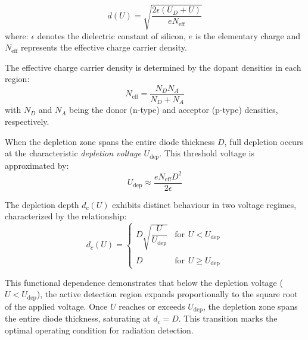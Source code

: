 \begin{equation}
    d(U) = \sqrt{ \frac{ 2 \epsilon (U_D + U) }{eN_{\mathrm{eff}} }}
\end{equation}
where: $\epsilon$ denotes the dielectric constant of silicon, $e$ is the elementary charge and $N_{\mathrm{eff}}$ represents the effective charge carrier density.

The effective charge carrier density is determined by the dopant densities in each region:
\begin{equation}
    N_{\mathrm{eff}} = \frac{ N_D N_A }{ N_D + N_A }
\end{equation}
with $N_D$ and $N_A$ being the donor (n-type) and acceptor (p-type) densities, respectively.

When the depletion zone spans the entire diode thickness $D$, full depletion occurs at the characteristic \textit{depletion voltage} $U_{\mathrm{dep}}$. This threshold voltage is approximated by:
\begin{equation}
    U_{\mathrm{dep}} \approx \frac{e N_{\mathrm{eff}} D^2}{2\epsilon}
\end{equation}

The depletion depth $d_c(U)$ exhibits distinct behaviour in two voltage regimes, characterized by the relationship:
\begin{equation}
d_c(U) = 
\begin{cases} 
D \sqrt{\dfrac{U}{U_{\mathrm{dep}}}} & \text{for}\hspace{5pt} U < U_{\mathrm{dep}} \\
\\
D & \text{for}\hspace{5pt} U \geq U_{\mathrm{dep}}
\end{cases}
\end{equation}

This functional dependence demonstrates that below the depletion voltage ($U < U_{\mathrm{dep}}$), the active detection region expands proportionally to the square root of the applied voltage. Once $U$ reaches or exceeds $U_{\mathrm{dep}}$, the depletion zone spans the entire diode thickness, saturating at $d_c = D$. This transition marks the optimal operating condition for radiation detection.

